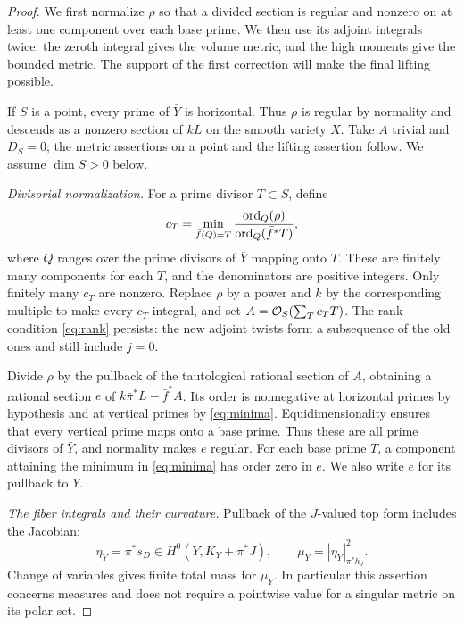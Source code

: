 \begin{proof}
We first normalize \(\rho\) so that a divided section is regular and
nonzero on at least one component over each base prime. We then use
its adjoint integrals twice: the zeroth integral gives the volume
metric, and the high moments give the bounded metric. The support
of the first correction will make the final lifting possible.

If \(S\) is a point, every prime of \(\bar Y\) is horizontal.
Thus \(\rho\) is regular by normality and descends as a nonzero
section of \(kL\) on the smooth variety \(X\).
Take \(A\) trivial and \(D_S=0\); the metric assertions on a point
and the lifting assertion follow. We assume \(\dim S>0\) below.

\medskip\noindent
\emph{Divisorial normalization.}
For a prime divisor \(T\subset S\), define
\begin{equation}\label{eq:minima}
 c_T=\min_{\bar f(Q)=T}
       \frac{\operatorname{ord}_Q(\rho)}{\operatorname{ord}_Q(\bar f^*T)},
\end{equation}
where \(Q\) ranges over the prime divisors of \(\bar Y\) mapping onto
\(T\). These are finitely many components for each \(T\), and the
denominators are positive integers. Only finitely many \(c_T\) are
nonzero. Replace \(\rho\) by a power and \(k\) by the corresponding
multiple to make every \(c_T\) integral, and set
\(A=\mathcal O_S(\sum_Tc_TT)\). The rank condition \eqref{eq:rank} persists:
the new adjoint twists form a subsequence of the old ones and still
include \(j=0\).

Divide \(\rho\) by the pullback of the tautological rational section
of \(A\), obtaining a rational section \(e\) of
\(k\bar\pi^*L-\bar f^*A\).
Its order is nonnegative at horizontal primes by hypothesis and at
vertical primes by \eqref{eq:minima}. Equidimensionality ensures that
every vertical prime maps onto a base prime. Thus these are all prime
divisors of \(\bar Y\), and normality makes \(e\) regular.
For each base prime \(T\), a component attaining the minimum in
\eqref{eq:minima} has order zero in \(e\).
We also write \(e\) for its pullback to \(Y\).

\medskip\noindent
\emph{The fiber integrals and their curvature.}
Pullback of the \(J\)-valued top form includes the Jacobian:
\[
 \eta_Y=\pi^*s_D\in H^0(Y,K_Y+\pi^*J),\qquad
 \mu_Y=|\eta_Y|_{\pi^*h_J}^2.
\]
Change of variables gives finite total mass for \(\mu_Y\).
In particular this assertion concerns measures and does not require
a pointwise value for a singular metric on its polar set.


\end{proof}
